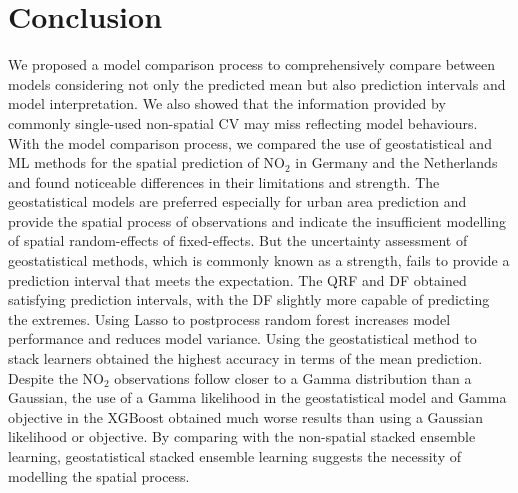 \documentclass{article}
\begin{document}
\section{Conclusion}
We proposed a model comparison process to comprehensively compare between models considering not only the predicted mean but also prediction intervals and model interpretation. We also showed that the information provided by commonly single-used non-spatial CV may miss reflecting model behaviours. With the model comparison process, we compared the use of geostatistical and ML methods for the spatial prediction of NO$_2$ in Germany and the Netherlands and found noticeable differences in their limitations and strength. The geostatistical models are preferred especially for urban area prediction and provide the spatial process of observations and indicate the insufficient modelling of spatial random-effects of fixed-effects. But the uncertainty assessment of geostatistical methods, which is commonly known as a strength, fails to provide a prediction interval that meets the expectation. The QRF and DF obtained satisfying prediction intervals, with the DF slightly more capable of predicting the extremes. Using Lasso to postprocess random forest increases model performance and reduces model variance. Using the geostatistical method to stack learners obtained the highest accuracy in terms of the mean prediction. Despite the NO$_2$ observations follow closer to a Gamma distribution than a Gaussian, the use of a Gamma likelihood in the geostatistical model and Gamma objective in the XGBoost obtained much worse results than using a Gaussian likelihood or objective. By comparing with the non-spatial stacked ensemble learning, geostatistical stacked ensemble learning suggests the necessity of modelling the spatial process.  

\newpage



\end{document}
